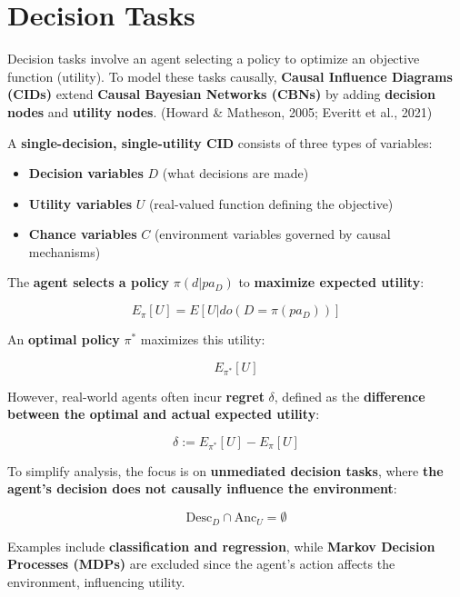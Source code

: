 \section{Decision Tasks}

Decision tasks involve an agent selecting a policy to optimize an objective function (utility). To model these tasks causally, \textbf{Causal Influence Diagrams (CIDs)} extend \textbf{Causal Bayesian Networks (CBNs)} by adding \textbf{decision nodes} and \textbf{utility nodes}.  (Howard \& Matheson, 2005; Everitt et al., 2021)

A \textbf{single-decision, single-utility CID} consists of three types of variables:
\begin{itemize}
	\item \textbf{Decision variables} \( D \) (what decisions are made)
	\item \textbf{Utility variables} \( U \) (real-valued function defining the objective)
	\item \textbf{Chance variables} \( C \) (environment variables governed by causal mechanisms)
\end{itemize}

The \textbf{agent selects a policy} \( \pi(d | pa_D) \) to \textbf{maximize expected utility}:

\[
	E_{\pi}[U] = E[U | do(D = \pi(pa_D))]
\]

An \textbf{optimal policy} \( \pi^* \) maximizes this utility:

\[
	E_{\pi^*}[U]
\]

However, real-world agents often incur \textbf{regret} \( \delta \), defined as the \textbf{difference between the optimal and actual expected utility}:

\[
	\delta := E_{\pi^*}[U] - E_{\pi}[U]
\]

To simplify analysis, the focus is on \textbf{unmediated decision tasks}, where \textbf{the agent's decision does not causally influence the environment}:

\[
	\text{Desc}_D \cap \text{Anc}_U = \emptyset
\]

Examples include \textbf{classification and regression}, while \textbf{Markov Decision Processes (MDPs)} are excluded since the agent's action affects the environment, influencing utility.
